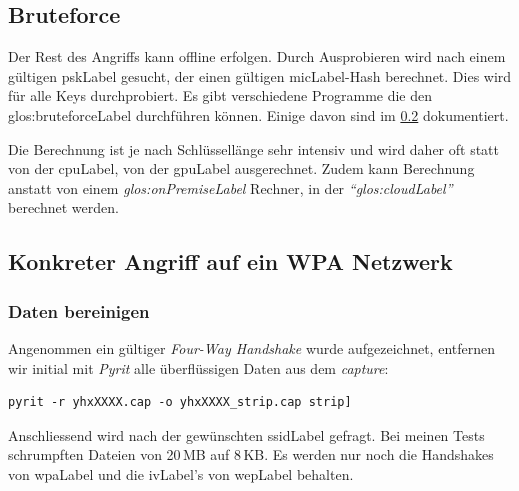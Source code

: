 \subsection{Bruteforce}
Der Rest des Angriffs kann offline erfolgen. Durch Ausprobieren wird nach einem gültigen \gls{pskLabel} gesucht, der einen gültigen \gls{micLabel}-Hash berechnet. Dies wird für alle Keys durchprobiert.
Es gibt verschiedene Programme die den \gls{glos:bruteforceLabel} durchführen können.
Einige davon sind im \cref{subsec:wpa_attack_tutorial} dokumentiert.

Die Berechnung ist je nach Schlüssellänge sehr intensiv und wird daher oft statt von der \gls{cpuLabel}, von der \gls{gpuLabel} ausgerechnet.
Zudem kann Berechnung anstatt von einem \textit{\gls{glos:onPremiseLabel}} Rechner, in der \textit{"`\gls{glos:cloudLabel}"'} berechnet werden.


\subsection{Konkreter Angriff auf ein WPA Netzwerk}
\label{subsec:wpa_attack_tutorial}


\subsubsection{Daten bereinigen}
Angenommen ein gültiger \textit{Four-Way Handshake} wurde aufgezeichnet, entfernen wir initial mit \textit{Pyrit} alle überflüssigen Daten aus dem \textit{capture}:
\begin{lstlisting}[style=lstStyleFramed]
pyrit -r yhxXXXX.cap -o yhxXXXX_strip.cap strip]
\end{lstlisting}
Anschliessend wird nach der gewünschten \gls{ssidLabel} gefragt.
Bei meinen Tests schrumpften Dateien von 20\,MB auf 8\,KB.
Es werden nur noch die Handshakes von \gls{wpaLabel} und die \gls{ivLabel}'s von \gls{wepLabel} behalten.

